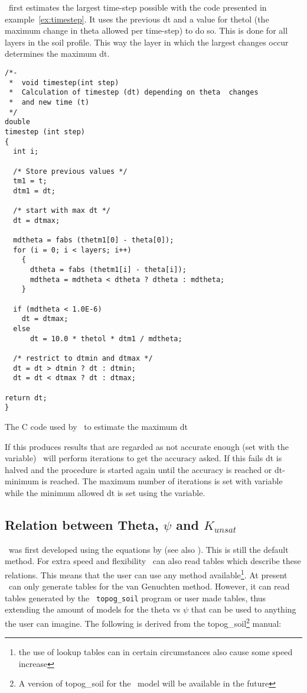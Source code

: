 \vamps\ first estimates the largest time-step possible with the code
presented in example~\ref{ex:timestep}. It uses the previous dt and
a value for thetol (the maximum change in theta allowed per time-step)
to do so. This is done for all layers in the soil profile. This way the
layer in which the largest changes occur determines the maximum dt.
\begin{Example}
\begin{verbatim}
/*-
 *	void timestep(int step)
 *	Calculation of timestep (dt) depending on theta  changes
 *	and new time (t)
 */
double
timestep (int step)
{
  int i;

  /* Store previous values */
  tm1 = t;
  dtm1 = dt;

  /* start with max dt */
  dt = dtmax;

  mdtheta = fabs (thetm1[0] - theta[0]);
  for (i = 0; i < layers; i++)
    {
      dtheta = fabs (thetm1[i] - theta[i]);
      mdtheta = mdtheta < dtheta ? dtheta : mdtheta;
    }

  if (mdtheta < 1.0E-6)
    dt = dtmax;
  else
      dt = 10.0 * thetol * dtm1 / mdtheta;

  /* restrict to dtmin and dtmax */
  dt = dt > dtmin ? dt : dtmin;
  dt = dt < dtmax ? dt : dtmax;

return dt;
}

\end{verbatim}
\caption{The C code used by \vamps\ to estimate the maximum dt}
\label{ex:timestep}
\end{Example}
If this produces results that are regarded as not accurate enough (set
with the  variable) \vamps\ will perform iterations to
get the accuracy asked. If this fails dt is halved and the procedure
is started again until the accuracy is reached or dt-minimum is
reached. The maximum number of iterations is set with 
variable while the minimum allowed dt is set using the 
variable.


\subsection{Relation between Theta, $\psi$  and  $K_{unsat}$} 
\vamps\ was first developed using the equations by 
 (see also ).
This is still the default method. For extra speed and flexibility
\vamps\ can also read tables which describe these relations. This
means that the user can use any method available\footnote{the use of
lookup tables can in certain circumstances also cause some speed
increase}. At present \vamps\ can only generate tables for the van
Genuchten method. However, it can read tables generated by the {\tt
topog\_soil} program \cite{beverly1994274} or user made tables, thus
extending the amount of models for the theta vs $\psi$ that can be
used to anything the user can imagine.  The following is derived from
the topog\_soil\footnote{A version of topog\_soil for the
\vamps\ model will be available in the future} manual:

